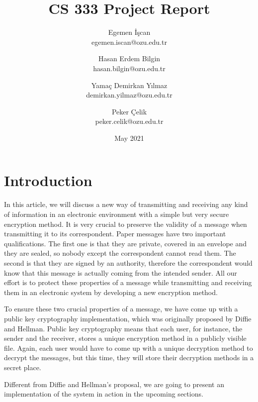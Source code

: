 \documentclass[12pt, letterpaper]{article}
\begin{document}
\title{\huge\textbf{CS 333 Project Report}}
\author{
Egemen İşcan\\
egemen.iscan@ozu.edu.tr
\and
Hasan Erdem Bilgin\\
hasan.bilgin@ozu.edu.tr
\and
Yamaç Demirkan Yılmaz\\
demirkan.yilmaz@ozu.edu.tr
\and
Peker Çelik\\
peker.celik@ozu.edu.tr
}
\date{May 2021}

\renewcommand\thesection{\Roman{section}}
\renewcommand{\thesubsection}{\Alph{subsection}}
\setlength{\parindent}{4em}
\setlength{\parskip}{1em}

\maketitle
\newpage
\tableofcontents

\newpage

\section{Introduction}

In this article, we will discuss a new way of transmitting and receiving any kind of information in an electronic environment with a simple but very secure encryption method. It is very crucial to preserve the validity of a message when transmitting it to its correspondent. Paper messages have two important qualifications. The first one is that they are private, covered in an envelope and they are sealed, so nobody except the correspondent cannot read them. The second is that they are signed by an authority, therefore the correspondent would know that this message is actually coming from the intended sender. All our effort is to protect these properties of a message while transmitting and receiving them in an electronic system by developing a new encryption method.
\par
To ensure these two crucial properties of a message, we have come up with a public key cryptography implementation, which was originally proposed by Diffie and Hellman. Public key cryptography means that each user, for instance, the sender and the receiver, stores a unique encryption method in a publicly visible file. Again, each user would have to come up with a unique decryption method to decrypt the messages, but this time, they will store their decryption methods in a secret place.
\par
Different from Diffie and Hellman’s proposal, we are going to present an implementation of the system in action in the upcoming sections.
\end{document}
